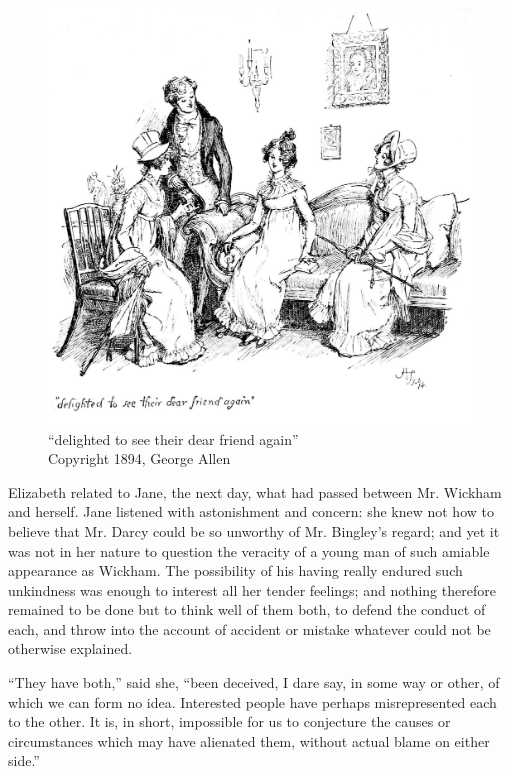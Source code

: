 \begin{figure}[htbp]
    \centering
    \includegraphics[width=\textwidth]{illustrations/i_137_a.jpg}
    \caption{“delighted to see their dear friend again”\\ Copyright 1894, George Allen}
    \label{fig:image}
\end{figure}


Elizabeth related to Jane, the next day, what had passed between Mr. Wickham and herself. Jane listened with astonishment and concern: she knew not how to believe that Mr. Darcy could be so unworthy of Mr. Bingley's regard; and yet it was not in her nature to question the veracity of a young man of such amiable appearance as Wickham. The possibility of his having really endured such unkindness was enough to interest all her tender feelings; and nothing therefore remained to be done but to think well of them both, to defend the conduct of each, and throw into the account of accident or mistake whatever could not be otherwise explained.

``They have both,'' said she, ``been deceived, I dare say, in some way or other, of which we can form no idea. Interested people have perhaps misrepresented each to the other. It is, in short, impossible for us to conjecture the causes or circumstances which may have alienated them, without actual blame on either side.''

